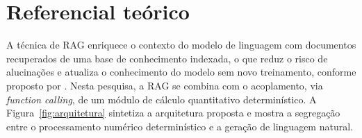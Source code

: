 
\section{Referencial teórico}

A técnica de RAG enriquece o contexto do modelo de linguagem com documentos
recuperados de uma base de conhecimento indexada, o que reduz o risco de
alucinações e atualiza o conhecimento do modelo sem novo treinamento, conforme
proposto por . Nesta pesquisa, a RAG se combina com o
acoplamento, via \textit{function calling}, de um módulo de cálculo
quantitativo determinístico. A Figura~\ref{fig:arquitetura} sintetiza a
arquitetura proposta e mostra a segregação entre o processamento numérico
determinístico e a geração de linguagem natural.

